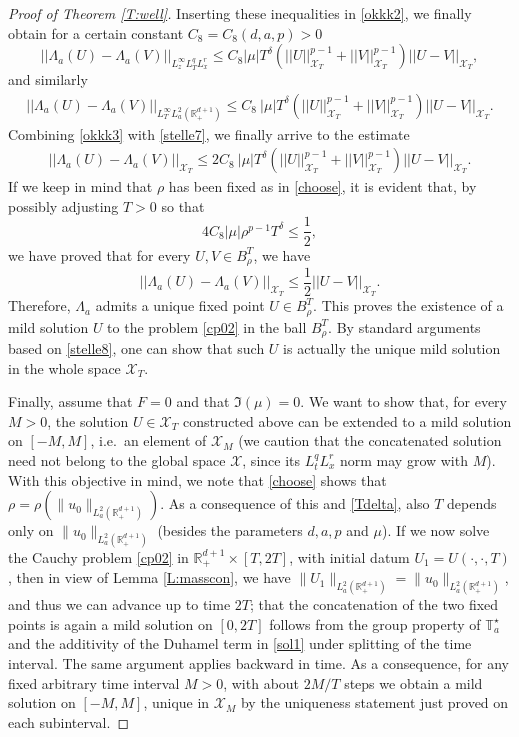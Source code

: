 \documentclass[10pt,a4paper]{amsart}
\def \RN {\mathbb{R}_+^{d+1}}
\newcommand{\XT}{\mathcal{X}_T}
\newcommand{\Xs}{\mathcal X}
\begin{document}
\begin{proof}[Proof of Theorem \ref{T:well}]
Inserting these inequalities in \eqref{okkk2}, we finally obtain for a certain constant $C_8 = C_8(d,a,p)>0$
\begin{equation}\label{okkk3}
||\Lambda_a(U) - \Lambda_a(V)||_{L^\infty_{z} L^q_T L^r_x } \le C_8 |\mu| T^{\delta} \left(||U||^{p-1}_{\XT} + ||V||^{p-1}_{\XT}\right) ||U - V||_{\XT},
\end{equation}
and similarly
\begin{align}\label{stelle7}
||\Lambda_a(U) - \Lambda_a(V)||_{L^\infty_T L^2_a(\RN)} \le C_8\ |\mu| T^{\delta} \left(||U||^{p-1}_{\XT} + ||V||^{p-1}_{\XT}\right) ||U - V||_{\XT}. 
\end{align}
Combining \eqref{okkk3} with \eqref{stelle7}, we finally arrive to the estimate
\begin{align}\label{stelle8}
||\Lambda_a(U) - \Lambda_a(V)||_{\XT} \le 2 C_8\ |\mu| T^{\delta} \left(||U||^{p-1}_{\XT} + ||V||^{p-1}_{\XT}\right) ||U - V||_{\XT}. 
\end{align}
If we keep in mind that $\rho$ has been fixed as in \eqref{choose}, it is evident that, by possibly adjusting $T>0$ so that
\begin{equation}\label{Tdelta}
4 C_8 |\mu| \rho^{p-1} T^{\delta} \le \frac 12,
\end{equation}
we have proved that for every $U, V \in B^T_\rho$, we have
\[
||\Lambda_a(U) - \Lambda_a(V)||_{\XT} \le \frac 12 ||U-V||_{\XT}.
\]
Therefore, $\Lambda_a$ admits a unique fixed point $U\in B^T_\rho$. This proves the existence of a mild solution $U$ to the problem \eqref{cp02} in the ball $B^T_\rho$. By standard arguments based on \eqref{stelle8}, one can show that such $U$ is actually the unique mild solution in the whole space $\XT$. 

Finally, assume that $F= 0$ and that $\Im(\mu) = 0$. We want to show that, for every $M>0$, the solution $U\in \XT$ constructed above can be extended to a mild solution on $[-M,M]$, i.e.\ an element of $\mathcal X_M$ (we caution that the concatenated solution need not belong to the global space $\Xs$, since its $L^q_tL^r_x$ norm may grow with $M$). With this objective in mind, we note that \eqref{choose} shows that  $\rho=\rho(\|u_0\|_{L^2_a(\RN)})$. As a consequence of this and \eqref{Tdelta}, also $T$ depends only on $\|u_0\|_{L^2_a(\RN)}$ (besides the parameters $d, a, p$ and $\mu$). If we now solve the Cauchy problem \eqref{cp02} in $\RN\times[T,2T]$, with initial datum $U_1 = U(\cdot,\cdot,T)$, then in view of Lemma \ref{L:masscon}, we have $\|U_1\|_{{L^2_a(\RN)}}= \|u_0\|_{L^2_a(\RN)}$, and thus we can advance up to time  $2T$; that the concatenation of the two fixed points is again a mild solution on $[0,2T]$ follows from the group property of $\mathbb T^\star_a$ and the additivity of the Duhamel term in \eqref{sol1} under splitting of the time interval. The same argument applies backward in time. As a consequence, for any fixed arbitrary time interval $M>0$, with about $2M/T$ steps we obtain a mild solution on $[-M,M]$, unique in $\mathcal X_M$ by the uniqueness statement just proved on each subinterval.  

\end{proof}
\end{document}
